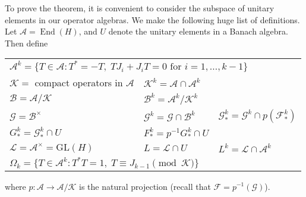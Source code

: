 \documentclass{shortart}
\theoremstyle{definition}
\newtheorem*{notation}{Notation}
\DeclareMathOperator{\End}{End}
\newcommand\GL{\mathrm{GL}}
\begin{document}
To prove the theorem, it is convenient to consider the subspace of unitary elements in our operator algebras. We make the following huge list of definitions. Let $\mathcal{A} = \End(H)$, and $U$ denote the unitary elements in a Banach algebra. Then define
\begin{center}
  \begin{tabular}{lll}
    \multicolumn{3}{l}{$\mathcal{A}^k = \{T \in \mathcal{A} : T^* = -T,\; T J_i + J_i T = 0\text{ for }i = 1, \ldots, k - 1\}$}\\
    $\mathcal{K} =$ compact operators in $\mathcal{A}$ & $\mathcal{K}^k = \mathcal{A} \cap \mathcal{A}^k$\\
    $\mathcal{B} = \mathcal{A}/\mathcal{K}$ & $\mathcal{B}^k = \mathcal{A}^k/\mathcal{K}^k$\\
    $\mathcal{G} = \mathcal{B}^\times$ & $\mathcal{G}^k = \mathcal{G}\cap \mathcal{B}^k$ & $\mathcal{G}^k_* = \mathcal{G}^k \cap p(\mathcal{F}^k_*)$\\
    $G^k_* = \mathcal{G}^k_* \cap U$ & $F^k_* = p^{-1} G^k_* \cap U$\\
    $\mathcal{L} = \mathcal{A}^\times = \GL(H)$ & $L = \mathcal{L} \cap U$ & $L^k = \mathcal{L} \cap \mathcal{A}^k$\\
    \multicolumn{3}{l}{$\Omega_k = \{T \in \mathcal{A}^k: T^*T = 1,\; T \equiv J_{k - 1} \pmod {\mathcal{K}}\}$}
  \end{tabular}
\end{center}
where $p: \mathcal{A} \to \mathcal{A}/\mathcal{K}$ is the natural projection (recall that $\mathcal{F} = p^{-1}(\mathcal{G})$).
\end{document}
